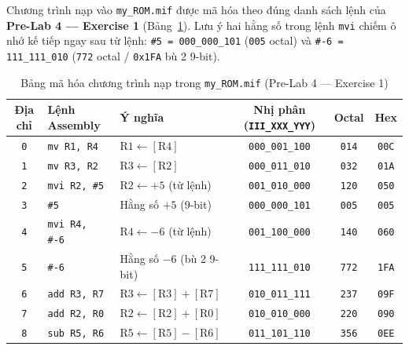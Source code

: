 \documentclass[11pt,a4paper]{article}
\newcommand{\code}[1]{\texttt{\small #1}}
\begin{document}
Chương trình nạp vào \code{my\_ROM.mif} được mã hóa theo đúng danh sách lệnh của \textbf{Pre-Lab 4 --- Exercise 1} (Bảng~\ref{tab:lab4_mif}). Lưu ý hai hằng số trong lệnh \code{mvi} chiếm ô nhớ kế tiếp ngay sau từ lệnh: \code{\#5 = 000\_000\_101} (\code{005} octal) và \code{\#-6 = 111\_111\_010} (\code{772} octal / \code{0x1FA} bù 2 9-bit).

\begin{table}[H]
  \centering
  \caption{Bảng mã hóa chương trình nạp trong \code{my\_ROM.mif} (Pre-Lab 4 --- Exercise 1)}
  \label{tab:lab4_mif}
  \small
  \renewcommand{\arraystretch}{1.08}
  \begin{tabular}{@{}c l l c c c@{}}
    \toprule
    \textbf{Địa chỉ} & \textbf{Lệnh Assembly} & \textbf{Ý nghĩa} & \textbf{Nhị phân (\code{III\_XXX\_YYY})} & \textbf{Octal} & \textbf{Hex} \\
    \midrule
    \code{0} & \code{mv R1, R4}   & $\text{R1} \leftarrow [\text{R4}]$         & \code{000\_001\_100} & \code{014} & \code{00C} \\
    \code{1} & \code{mv R3, R2}   & $\text{R3} \leftarrow [\text{R2}]$         & \code{000\_011\_010} & \code{032} & \code{01A} \\
    \code{2} & \code{mvi R2, \#5} & $\text{R2} \leftarrow +5$ (từ lệnh)        & \code{001\_010\_000} & \code{120} & \code{050} \\
    \code{3} & \code{\#5}         & Hằng số $+5$ (9-bit)                       & \code{000\_000\_101} & \code{005} & \code{005} \\
    \code{4} & \code{mvi R4, \#-6}& $\text{R4} \leftarrow -6$ (từ lệnh)        & \code{001\_100\_000} & \code{140} & \code{060} \\
    \code{5} & \code{\#-6}        & Hằng số $-6$ (bù 2 9-bit)                  & \code{111\_111\_010} & \code{772} & \code{1FA} \\
    \code{6} & \code{add R3, R7}  & $\text{R3} \leftarrow [\text{R3}]+[\text{R7}]$ & \code{010\_011\_111} & \code{237} & \code{09F} \\
    \code{7} & \code{add R2, R0}  & $\text{R2} \leftarrow [\text{R2}]+[\text{R0}]$ & \code{010\_010\_000} & \code{220} & \code{090} \\
    \code{8} & \code{sub R5, R6}  & $\text{R5} \leftarrow [\text{R5}]-[\text{R6}]$ & \code{011\_101\_110} & \code{356} & \code{0EE} \\
    \bottomrule
  \end{tabular}
\end{table}
\end{document}
